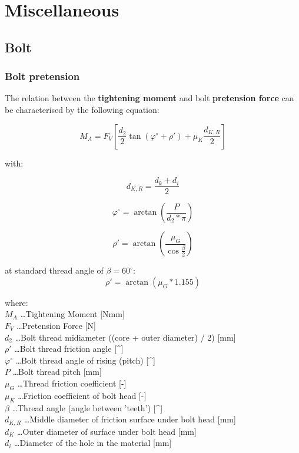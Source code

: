 \newpage
\chapter{Miscellaneous}

\section{Bolt}

\subsection{Bolt pretension}

The relation between the \textbf{tightening moment} and bolt \textbf{pretension force}
can be characterised by the following equation:

\begin{equation}
    M_A = F_V \left[
        \frac{d_2}{2} \tan{\left( \varphi^{\circ} + \rho'\right )}
            + \mu_K \frac{d_{K,R}}{2}
    \right]
\end{equation}

with:

\begin{equation}
    d_{K,R} = \frac{d_k + d_{i}}{2}
\end{equation}

\begin{equation}
    \varphi^{\circ} = \arctan{\left( \frac{P}{d_2 * \pi} \right)}
\end{equation}

\begin{equation}
    \rho' = \arctan{\left( \frac{\mu_G}{\cos{ \frac{\beta}{2} }} \right)}
\end{equation}

at standard thread angle of $ \beta = 60^{\circ} $:
\begin{equation}
    \rho' = \arctan{\left(\mu_G * 1.155 \right)}
\end{equation}

where:\\
$ M_A $ \ldots Tightening Moment [Nmm] \\
$ F_V $ \ldots Pretension Force [N] \\
$ d_2 $ \ldots Bolt thread midiameter ((core + outer diameter) / 2) [mm]\\
$ \rho' $ \ldots Bolt thread friction angle [^{\circ}]\\
$ \varphi^{\circ} $ \ldots Bolt thread angle of rising (pitch) [^{\circ}]\\
$ P $ \ldots Bolt thread pitch [mm]\\
$ \mu_G $ \ldots Thread friction coefficient [-]\\
$ \mu_K $ \ldots Friction coefficient of bolt head [-]\\
$ \beta $ \ldots Thread angle (angle between 'teeth') [^{\circ}]\\
$ d_{K,R} $ \ldots Middle diameter of friction surface under bolt head [mm]\\
$ d_{K} $ \ldots Outer diameter of surface under bolt head [mm]\\
$ d_{i} $ \ldots Diameter of the hole in the material [mm]\\


